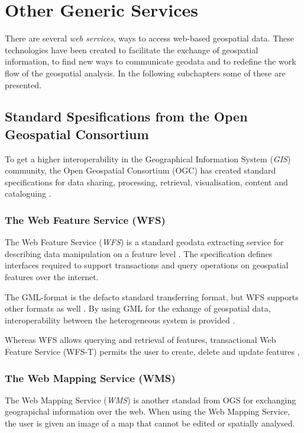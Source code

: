 \section{Other Generic Services}
There are several \textit{web services}, ways to access web-based geospatial data. These technologies have been created to facilitate the exchange of geospatial information, to find new ways to communicate geodata and to redefine the work flow of the geospatial analysis. In the following subchapters some of these are presented.  

\subsection{Standard Spesifications from the Open Geospatial Consortium}\label{OGC}
To get a higher interoperability in the Geographical Information System (\textit{GIS}) community, the Open Geospatial Consortium (OGC) has created standard specifications for data sharing, processing, retrieval, visualisation, content and cataloguing \citep{giuliani2013}.

\subsubsection{The Web Feature Service (WFS)}\label{wfs}

The Web Feature Service (\textit{WFS}) is a standard geodata extracting service for describing data manipulation on a feature level \citep{Peng2005, Norgedigitalt2014}. The specification defines interfaces required to support transactions and query operations on geospatial features over the internet.

The GML-format is the defacto standard transferring format, but WFS supports other formats as well \citep{Eggan2017}. By using GML for the exhange of geospatial data,  interoperability between the heterogeneous system is provided \citep{YaoXiaobai2008Iimo}.

Whereas WFS allows querying and retrieval of features, transactional Web Feature Service (WFS-T) permits the user to create, delete and update features \citep{OGCNetwork},

\subsubsection{The Web Mapping Service (WMS)}
The Web Mapping Service (\textit{WMS}) is another standad from OGS for exchanging geograpichal information over the web. When using the Web Mapping Service, the user is given an image of a map that cannot be edited or spatially analysed. 	


